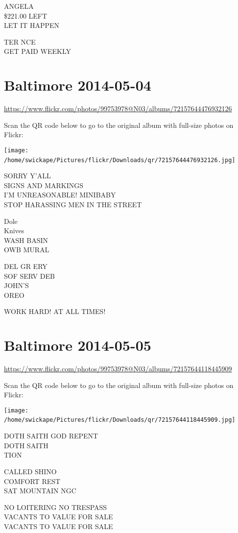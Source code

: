 \documentclass[10pt,letterpaper]{article}
\begin{document}
ANGELA\\
\$221.00 LEFT\\
LET IT HAPPEN

TER NCE\\
GET PAID WEEKLY
\

\section*{Baltimore 2014-05-04}

\url{https://www.flickr.com/photos/99753978@N03/albums/72157644476932126}

Scan the QR code below to go to the original album with full-size photos on Flickr:

\texttt{[image: /home/swickape/Pictures/flickr/Downloads/qr/72157644476932126.jpg]}
\

SORRY Y'ALL\\
SIGNS AND MARKINGS\\
I'M UNREASONABLE! MINIBABY\\
STOP HARASSING MEN IN THE STREET

Dole\\
Knives\\
WASH BASIN\\
OWB MURAL

DEL GR ERY\\
SOF SERV DEB\\
JOHN'S\\
OREO

WORK HARD!  AT ALL TIMES!
\

\section*{Baltimore 2014-05-05}

\url{https://www.flickr.com/photos/99753978@N03/albums/72157644118445909}

Scan the QR code below to go to the original album with full-size photos on Flickr:

\texttt{[image: /home/swickape/Pictures/flickr/Downloads/qr/72157644118445909.jpg]}
\

DOTH SAITH GOD REPENT\\
DOTH SAITH\\
TION

CALLED SHINO\\
COMFORT REST\\
SAT MOUNTAIN NGC

NO LOITERING NO TRESPASS\\
VACANTS TO VALUE FOR SALE\\
VACANTS TO VALUE FOR SALE
\end{document}
